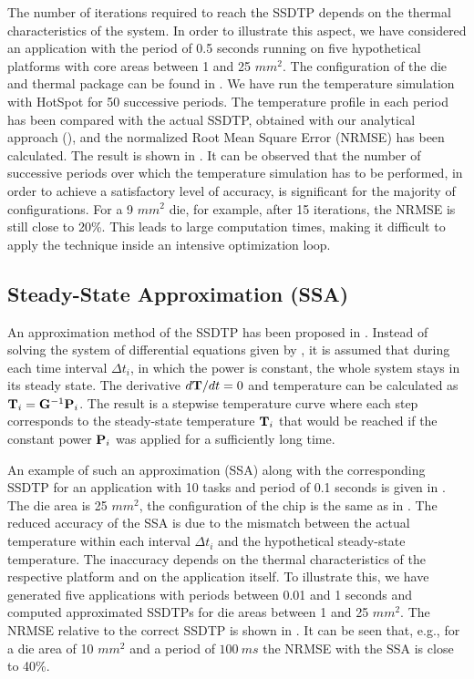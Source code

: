 The number of iterations required to reach the SSDTP depends on the thermal characteristics of the system. In order to illustrate this aspect, we have considered an application with the period of 0.5 seconds running on five hypothetical platforms with core areas between 1 and 25 $mm^2$. The configuration of the die and thermal package can be found in . We have run the temperature simulation with HotSpot \cite{huang2003} for 50 successive periods. The temperature profile in each period has been compared with the actual SSDTP, obtained with our analytical approach (), and the normalized Root Mean Square Error (NRMSE) has been calculated. The result is shown in . It can be observed that the number of successive periods over which the temperature simulation has to be performed, in order to achieve a satisfactory level of accuracy, is significant for the majority of configurations. For a 9 $mm^2$ die, for example, after 15 iterations, the NRMSE is still close to 20\%. This leads to large computation times, making it difficult to apply the technique inside an intensive optimization loop.

\subsection{Steady-State Approximation (SSA)} \label{sec:steady-state-approximation}
An approximation method of the SSDTP has been proposed in \cite{huang2009}. Instead of solving the system of differential equations given by , it is assumed that during each time interval $\Delta t_i$, in which the power is constant, the whole system stays in its steady state. The derivative $d\mathbf{T}/dt = 0$ and temperature can be calculated as $\mathbf{T}_i = \mathbf{G}^{-1} \mathbf{P}_i$. The result is a stepwise temperature curve where each step corresponds to the steady-state temperature $\mathbf{T}_i$ that would be reached if the constant power $\mathbf{P}_i$ was applied for a sufficiently long time.

An example of such an approximation (SSA) along with the corresponding SSDTP for an application with 10 tasks and period of 0.1 seconds is given in . The die area is 25 $mm^2$, the configuration of the chip is the same as in . The reduced accuracy of the SSA is due to the mismatch between the actual temperature within each interval $\Delta t_i$ and the hypothetical steady-state temperature. The inaccuracy depends on the thermal characteristics of the respective platform and on the application itself. To illustrate this, we have generated five applications with periods between 0.01 and 1 seconds and computed approximated SSDTPs for die areas between 1 and 25 $mm^2$. The NRMSE relative to the correct SSDTP is shown in . It can be seen that, e.g., for a die area of 10 $mm^2$ and a period of $100~ms$ the NRMSE with the SSA is close to 40\%.
